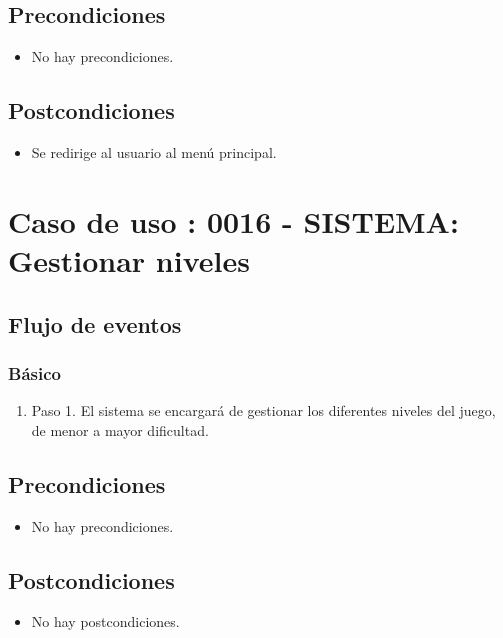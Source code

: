 \subsection{Precondiciones}
\begin{itemize}
\item No hay precondiciones.
\end{itemize}

\subsection{Postcondiciones}
\begin{itemize}
\item Se redirige al usuario al menú principal.
\end{itemize}



\section{Caso de uso : 0016 - SISTEMA: Gestionar niveles}\label{sec:uc0}
\subsection{Flujo de eventos}
\subsubsection{Básico}

\begin{enumerate}
\item Paso 1.
El sistema se encargará de gestionar los diferentes niveles del juego, de menor a mayor dificultad.
\end{enumerate}

\subsection{Precondiciones}
\begin{itemize}
\item No hay precondiciones.
\end{itemize}

\subsection{Postcondiciones}
\begin{itemize}
\item No hay postcondiciones.
\end{itemize}



